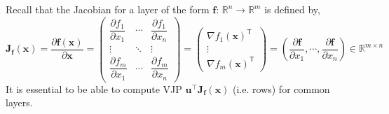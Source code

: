 \documentclass[11pt]{article}
\begin{document}
Recall that the Jacobian for a layer of the form $\boldsymbol{f}: \, \mathbb{R}^n \to \mathbb{R}^m$ is defined by,
\[
\boldsymbol{J}_{\boldsymbol{f}}(\boldsymbol{x}) = \frac{\partial \boldsymbol{f}(\boldsymbol{x})}{\partial \boldsymbol{x}} = \begin{pmatrix} \dfrac{\partial f_1}{\partial x_1} & \cdots & \dfrac{\partial f_1}{\partial x_n} \\ \vdots & \ddots & \vdots \\ \dfrac{\partial f_m}{\partial x_1} & \cdots & \dfrac{\partial f_m}{\partial x_n} \end{pmatrix} = \begin{pmatrix} \nabla f_1(\boldsymbol{x})^\mathsf{T} \\ \vdots \\ \nabla f_m(\boldsymbol{x})^\mathsf{T} \end{pmatrix} = \left( \frac{\partial \boldsymbol{f}}{\partial x_1}, \cdots, \frac{\partial \boldsymbol{f}}{\partial x_n} \right)
\in \mathbb{R}^{m \times n}
\]
It is essential to be able to compute VJP $\boldsymbol{u}^\top \boldsymbol{J}_{\boldsymbol{f}}(\boldsymbol{x})$ (i.e. rows) for common layers.
\end{document}
